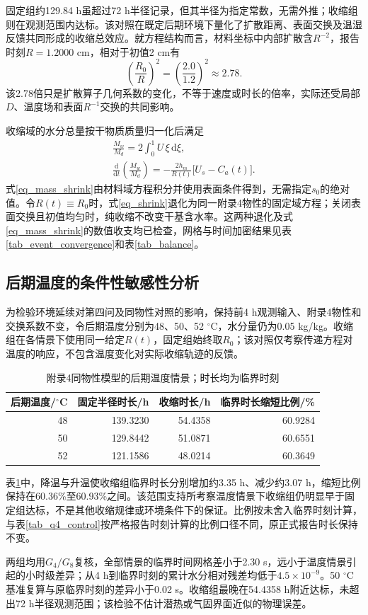 固定组约129.84 h虽超过72 h半径记录，但其半径为指定常数，无需外推；收缩组则在观测范围内达标。该对照在既定后期环境下量化了扩散距离、表面交换及温湿反馈共同形成的收缩总效应。就方程结构而言，材料坐标中内部扩散含$R^{-2}$，报告时刻$R=1.2000$ cm，相对于初值2 cm有
\[
\left(\frac{R_0}{R}\right)^2=\left(\frac{2.0}{1.2}\right)^2\approx2.78.
\]
该2.78倍只是扩散算子几何系数的变化，不等于速度或时长的倍率，实际还受局部$D$、温度场和表面$R^{-1}$交换的共同影响。

收缩域的水分总量按干物质质量归一化后满足
\begin{equation}\label{eq_mass_shrink}
\begin{gathered}
\frac{M_w}{M_d}=2\int_0^1 U\,\xi\,\mathrm d\xi,\\[4pt]
\frac{\mathrm d}{\mathrm dt}\left(\frac{M_w}{M_d}\right)
=-\frac{2h_m}{R(t)}\bigl[U_s-C_a(t)\bigr].
\end{gathered}
\end{equation}
式\eqref{eq_mass_shrink}由材料域方程积分并使用表面条件得到，无需指定$s_0$的绝对值。令$R(t)\equiv R_0$时，式\eqref{eq_shrink}退化为同一附录4物性的固定域方程；关闭表面交换且初值均匀时，纯收缩不改变干基含水率。这两种退化及式\eqref{eq_mass_shrink}的数值收支均已检查，网格与时间加密结果见表\ref{tab_event_convergence}和表\ref{tab_balance}。

\subsection{后期温度的条件性敏感性分析}
为检验环境延续对第四问及同物性对照的影响，保持前4 h观测输入、附录4物性和交换系数不变，令后期温度分别为48、50、52 $^\circ$C，水分量仍为0.05 kg/kg。收缩组在各情景下使用同一给定$R(t)$，固定组始终取$R_0$；该对照仅考察传递方程对温度的响应，不包含温度变化对实际收缩轨迹的反馈。
\begin{table}[htbp]\centering\small
\caption{附录4同物性模型的后期温度情景；时长均为临界时刻}\label{tab_q4_temperature}
\begin{tabular}{rrrr}\toprule
后期温度/$^\circ$C & 固定半径时长/h & 收缩时长/h & 临界时长缩短比例/\%\\\midrule
48 & 139.3230 & 54.4358 & 60.9284\\
50 & 129.8442 & 51.0871 & 60.6551\\
52 & 121.1586 & 48.0214 & 60.3649\\\bottomrule
\end{tabular}
\end{table}
表\ref{tab_q4_temperature}中，降温与升温使收缩组临界时长分别增加约3.35 h、减少约3.07 h，缩短比例保持在60.36\%至60.93\%之间。该范围支持所考察温度情景下收缩组仍明显早于固定组达标，不是其他收缩规律或环境条件下的保证。比例按未舍入临界时刻计算，与表\ref{tab_q4_control}按严格报告时刻计算的比例口径不同，原正式报告时长保持不变。

两组均用$G_4/G_8$复核，全部情景的临界时间网格差小于2.30 s，远小于温度情景引起的小时级差异；从4 h到临界时刻的累计水分相对残差均低于$4.5\times10^{-9}$。50 $^\circ$C基准复算与原临界时刻的差异小于0.02 s。收缩组最晚在54.4358 h附近达标，未超出72 h半径观测范围；该检验不估计潜热或气固界面近似的物理误差。
\FloatBarrier
